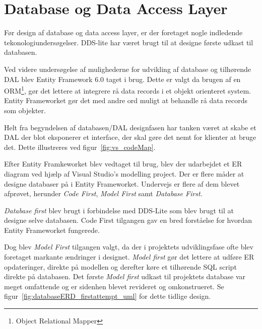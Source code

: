 \section{Database og Data Access Layer}\label{sec:designdatabase}

Før design af database og data access layer, er der foretaget nogle indledende tekonologiundersøgelser. DDS-lite har været brugt til at designe første udkast til databasen.

Ved videre undersøgelse af mulighederne for udvikling af database og tilhørende DAL blev Entity Framework 6.0 taget i brug. Dette er valgt da brugen af en ORM\footnote{Object Relational Mapper}, gør det lettere at integrere rå data records i et objekt orienteret system. Entity Frameworket gør det med andre ord muligt at behandle rå data records som objekter. 

Helt fra begyndelsen af databasen/DAL designfasen har tanken været at skabe et DAL der blot eksponerer et interface, der skal gøre det nemt for klienter at bruge det. Dette illustreres ved figur~\ref{fig:vs_codeMap}.

Efter Entity Framkeworket blev vedtaget til brug, blev der udarbejdet et ER diagram ved hjælp af Visual Studio's modelling project. Der er flere måder at designe databaser på i Entity Frameworket. Undervejs er flere af dem blevet afprøvet, herunder \textit{Code First}, \textit{Model First} samt \textit{Database First}.

\textit{Database first} blev brugt i forbindelse med DDS-Lite som blev brugt til at designe selve databasen. Code First tilgangen gav en bred forståelse for hvordan Entity Frameworket fungerede.

Dog blev \textit{Model First} tilgangen valgt, da der i projektets udviklingsfase ofte blev foretaget markante ændringer i designet. \textit{Model first} gør det lettere at udføre ER opdateringer, direkte på modellen og derefter køre et tilhørende SQL script direkte på databasen. Det første \textit{Model first} udkast til projektets database var meget omfattende og er sidenhen blevet revideret og omkonstrueret. Se figur~\ref{fig:databaseERD_firstattempt_uml} for dette tidlige design.

